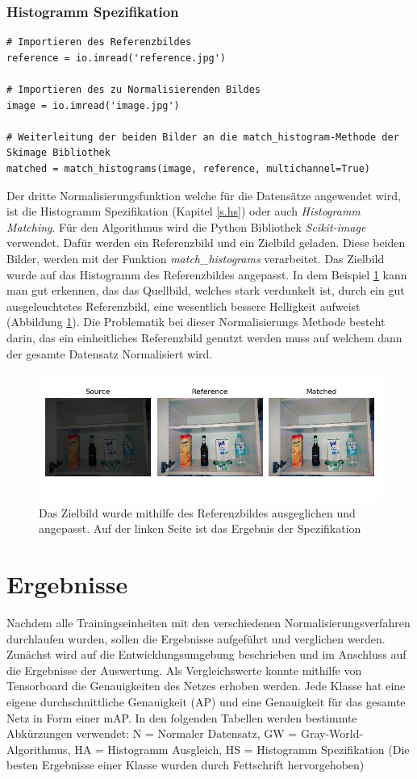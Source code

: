 \documentclass[a4paper,12pt,oneside]{article}
\begin{document}
\subsubsection{Histogramm Spezifikation}
\begin{lstlisting}
# Importieren des Referenzbildes
reference = io.imread('reference.jpg')

# Importieren des zu Normalisierenden Bildes
image = io.imread('image.jpg')

# Weiterleitung der beiden Bilder an die match_histogram-Methode der Skimage Bibliothek
matched = match_histograms(image, reference, multichannel=True)
\end{lstlisting}
Der dritte Normalisierungsfunktion welche für die Datensätze angewendet wird, ist die Histogramm Spezifikation (Kapitel \ref{s.hs}) oder auch \textit{Histogramm Matching}. Für den Algorithmus wird die Python Bibliothek \textit{Scikit-image} verwendet. Dafür werden ein Referenzbild und ein Zielbild geladen. Diese beiden Bilder, werden mit der Funktion \textit{match\_histograms} verarbeitet. Das Zielbild wurde auf das Histogramm des Referenzbildes angepasst. In dem Beispiel \ref{img:histogramspez} kann man gut erkennen, das das Quellbild, welches stark verdunkelt ist, durch ein gut ausgeleuchtetes Referenzbild, eine wesentlich bessere Helligkeit aufweist (Abbildung \ref{img:histogramspez}). Die Problematik bei dieser Normalisierungs Methode besteht darin, das ein einheitliches Referenzbild genutzt werden muss auf welchem dann der gesamte Datensatz Normalisiert wird.
\begin{figure}
	[h]
	\centering
	\includegraphics[scale=0.8]{Sources/HS_beispiel.png}
	\caption{Das Zielbild wurde mithilfe des Referenzbildes ausgeglichen und angepasst. Auf der linken Seite ist das Ergebnis der Spezifikation}
	\label{img:histogramspez}
\end{figure}
  \newpage
\section{Ergebnisse}\label{s.ergebnisse}
Nachdem alle Trainingseinheiten mit den verschiedenen Normalisierungsverfahren durchlaufen wurden, sollen die Ergebnisse aufgeführt und verglichen werden. Zunächst wird auf die Entwicklungsumgebung beschrieben und im Anschluss auf die Ergebnisse der Auswertung. Als Vergleichswerte konnte mithilfe von Tensorboard die Genauigkeiten des Netzes erhoben werden. Jede Klasse hat eine eigene durchschnittliche Genauigkeit (AP) und eine Genauigkeit für das gesamte Netz in Form einer mAP. In den folgenden Tabellen werden bestimmte Abkürzungen verwendet: N = Normaler Datensatz, GW = Gray-World-Algorithmus, HA = Histogramm Ausgleich, HS = Histogramm Spezifikation (Die besten Ergebnisse einer Klasse wurden durch Fettschrift hervorgehoben) 
\end{document}
